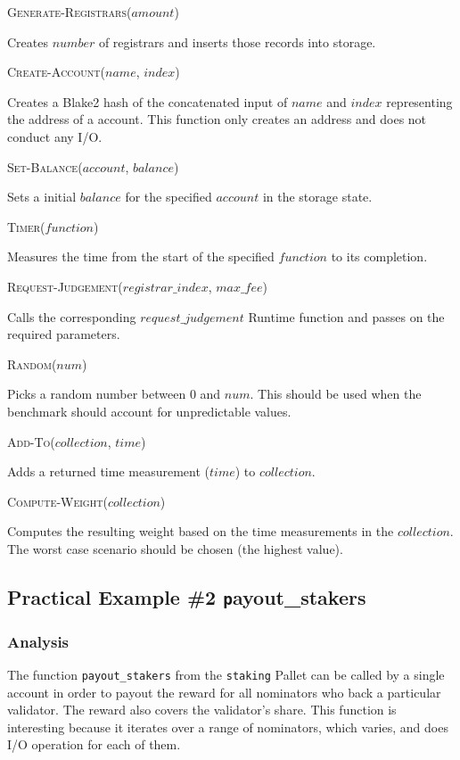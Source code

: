 \documentclass[11pt,a4paper]{article}
\newcommand{\SubItem}[1]{
    {\setlength\itemindent{15pt} \item[-] #1}
}
\begin{document}
\begin{itemize}
  \item \textsc{Generate-Registrars($amount$)}
  \SubItem{Creates $number$ of registrars and inserts those records into storage.}
  \item \textsc{Create-Account($name$, $index$)} \SubItem{Creates a Blake2 hash
      of the concatenated input of $name$ and $index$ representing the address
      of a account. This function only creates an address and does not conduct
      any I/O.}
  \item \textsc{Set-Balance($account$, $balance$)}
  \SubItem{Sets a initial $balance$ for the specified $account$ in the storage state.}
  \item \textsc{Timer($function$)}
  \SubItem{Measures the time from the start of the specified $function$ to its completion.}
  \item \textsc{Request-Judgement($registrar\_index$, $max\_fee$)}
  \SubItem{Calls the corresponding $request\_judgement$ Runtime function and passes on
  the required parameters.}
  \item \textsc{Random($num$)}
  \SubItem{Picks a random number between 0 and $num$. This should be used when the benchmark
  should account for unpredictable values.}
  \item \textsc{Add-To($collection$, $time$)}
  \SubItem{Adds a returned time measurement ($time$) to $collection$.}
  \item \textsc{Compute-Weight($collection$)}
  \SubItem{Computes the resulting weight based on the time measurements in the
  $collection$. The worst case scenario should be chosen (the highest value).}
\end{itemize}

\subsection{Practical Example \#2 {\texttt payout\_stakers}}\label{sec:practical-example-payout-stakers}

\subsubsection{Analysis}

The function \verb|payout_stakers| from the \verb|staking| Pallet can be called
by a single account in order to payout the reward for all nominators who back a
particular validator. The reward also covers the validator's share. This
function is interesting because it iterates over a range of nominators, which
varies, and does I/O operation for each of them.
\newline
\end{document}
